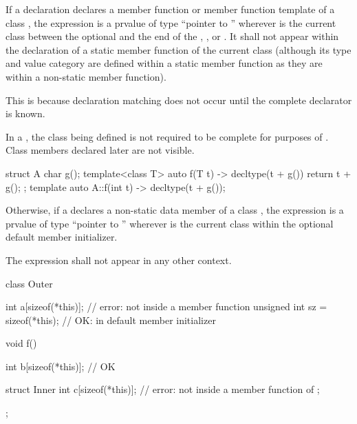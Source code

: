 \pnum
If a declaration declares a member function or member function template of a
class , the expression  is a prvalue of type ``pointer to
 ''
wherever  is the current class
between the optional
 and the end of the ,
, or . It shall not appear within
the declaration of a static member function of the current class (although its type and value category
are defined within a static member function as they are within a non-static
member function).
\begin{note}
This is because declaration matching does not
occur until the complete declarator is known.
\end{note}
\begin{note}
In a ,
the class being defined is not required to be complete
for purposes of .
Class members declared later are not visible.
\begin{example}
\begin{codeblock}
struct A {
  char g();
  template<class T> auto f(T t) -> decltype(t + g())
    { return t + g(); }
};
template auto A::f(int t) -> decltype(t + g());
\end{codeblock}
\end{example}
\end{note}

\pnum
Otherwise, if a  declares a non-static data
member of a class , the expression  is
a prvalue of type ``pointer to ''
wherever  is the current class
within the
optional default member initializer.

\pnum
The expression  shall not appear in any other context.
\begin{example}
\begin{codeblock}
class Outer {
  int a[sizeof(*this)];                 // error: not inside a member function
  unsigned int sz = sizeof(*this);      // OK: in default member initializer

  void f() {
    int b[sizeof(*this)];               // OK

    struct Inner {
      int c[sizeof(*this)];             // error: not inside a member function of 
    };
  }
};
\end{codeblock}
\end{example}

